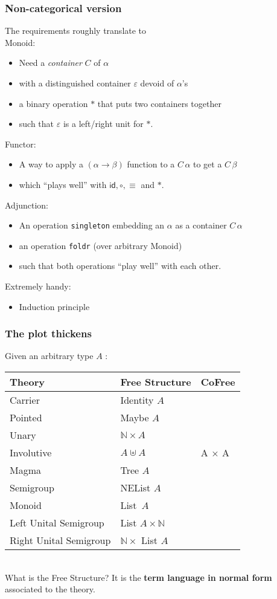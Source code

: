 \documentclass[serif,mathserif,professionalfont,10pt]{beamer}
\newcommand{\sred}[1]{\textcolor{slidered}{#1}}
\newcommand{\sblue}[1]{\textcolor{slideblue}{#1}}
\begin{document}
\begin{frame}
\frametitle{Non-categorical version}
The requirements roughly translate to\\
Monoid:
\begin{itemize}
\item Need a \emph{container} $C$ of $\alpha$
\item with a distinguished container $ε$ devoid of $\alpha$'s
\item a binary operation $*$ that puts two containers together
\item such that $ε$ is a left/right unit for $*$.
\end{itemize}
Functor:
\begin{itemize}
\item A way to apply a $(\alpha → \beta)$ function to a $C\, \alpha$ to get a $C \, \beta$
\item which ``plays well'' with $\mathsf{id}, ∘, ≡$ and $*$.
\end{itemize}
Adjunction:
\begin{itemize}
\item An operation \texttt{singleton} embedding an $\alpha$ as a container $C \, \alpha$
\item an operation \texttt{foldr} (over arbitrary Monoid)
\item such that both operations ``play well'' with each other.
\end{itemize}
Extremely handy:
\begin{itemize}
\item Induction principle
\end{itemize}
\end{frame}
%
%

\begin{frame}
\frametitle{The plot thickens}
Given an arbitrary type $A$ : \\ \vspace*{4mm}
\begin{tabular}{lll}
\textbf{Theory} & \textbf{Free Structure} & CoFree \\ \hline
Carrier & Identity $A$ & \\
Pointed & Maybe $A$ & \\ \hline
Unary & $ℕ × A$ &  \\
Involutive & $A ⊎ A$ & A × A \\ \hline
Magma & Tree $A$ &  \\
Semigroup & NEList $A$ & \\ \hline
Monoid & List\, $A$ & \\
Left Unital Semigroup & List $A × ℕ$ & \\
Right Unital Semigroup & $ℕ ×$ List $A$ & \\ \hline
\end{tabular}\\ \vspace*{4mm}
\pause
What is the \sblue{Free Structure}? It is the
\sred{\textbf{term language in normal form}} associated to the theory.\\
\end{frame}
\end{document}
